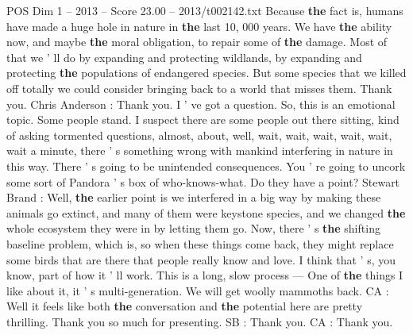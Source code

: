 \begin{textsample}{POS Dim 1 – 2013 – Score 23.00 – 2013/t002142.txt}
Because \textbf{the} fact is, humans have made a huge hole in nature in \textbf{the} last 10, 000 years.
We have \textbf{the} ability now, and maybe \textbf{the} moral obligation, to repair some of \textbf{the} damage.
Most of that we ' ll do by expanding and protecting wildlands, by expanding and protecting \textbf{the} populations of endangered species.
But some species that we killed off totally we could consider bringing back to a world that misses them.
Thank you.
Chris Anderson : Thank you.
I ' ve got a question.
So, this is an emotional topic.
Some people stand.
I suspect there are some people out there sitting, kind of asking tormented questions, almost, about, well, wait, wait, wait, wait, wait, wait a minute, there ' s something wrong with mankind interfering in nature in this way.
There ' s going to be unintended consequences.
You ' re going to uncork some sort of Pandora ' s box of who-knows-what.
Do they have a point?
Stewart Brand : Well, \textbf{the} earlier point is we interfered in a big way by making these animals go extinct, and many of them were keystone species, and we changed \textbf{the} whole ecosystem they were in by letting them go.
Now, there ' s \textbf{the} shifting baseline problem, which is, so when these things come back, they might replace some birds that are there that people really know and love.
I think that ' s, you know, part of how it ' ll work.
This is a long, slow process — One of \textbf{the} things I like about it, it ' s multi-generation.
We will get woolly mammoths back.
CA : Well it feels like both \textbf{the} conversation and \textbf{the} potential here are pretty thrilling.
Thank you so much for presenting.
SB : Thank you.
CA : Thank you.

\end{textsample}
